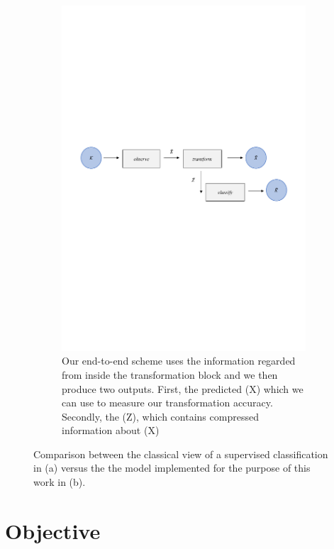 \begin{figure}[H]
	\begin{subfigure}{1\textwidth} 
		\centering
		\includegraphics[width=16.5cm]{Figuras_tfg/Figura1_1_tfg}
		\caption{Our end-to-end scheme uses the information regarded from inside the transformation block and we then produce two outputs. First, the predicted (X) which we can use to measure our transformation accuracy. Secondly, the (Z), which contains compressed information about (X)}
		\label{fig:fig1a} 
	\end{subfigure}%
	\caption{Comparison between the classical view of a supervised classification in (a) versus the the model implemented for the purpose of this work in (b).}
	\label{fig:fig1}
\end{figure}

\section{Objective}

